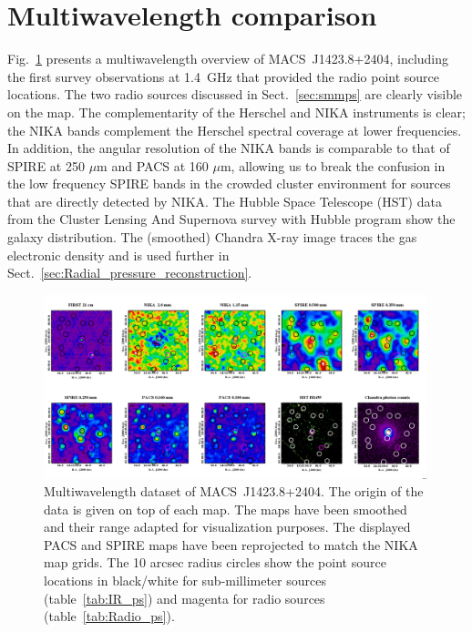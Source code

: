 \documentclass[traditabstract]{aa}
\begin{document}
\section{Multiwavelength comparison}\label{sec:Multi_wavelength_comparison}
Fig.~\ref{fig:MACSJ1424_mutiw2} presents a multiwavelength overview of \mbox{MACS~J1423.8+2404}, including the {\sc first} survey \citep[Faint Images of the Radio Sky at Twenty-Centimeters;][]{becker1995} observations at 1.4~GHz that provided the radio point source locations. The two radio sources discussed in Sect.~\ref{sec:smmps} are clearly visible on the map. The complementarity of the Herschel and NIKA instruments is clear; the NIKA bands complement the Herschel spectral coverage at lower frequencies. In addition, the angular resolution of the NIKA bands is comparable to that of SPIRE at 250 $\mu$m and PACS at 160 $\mu$m, allowing us to break the confusion in the low frequency SPIRE bands in the crowded cluster environment for sources that are directly detected by NIKA. The Hubble Space Telescope (HST) data from the Cluster Lensing And Supernova survey with Hubble program \citep[CLASH;][]{postman2012} show the galaxy distribution. The (smoothed) Chandra X-ray image traces the gas electronic density and is used further in Sect.~\ref{sec:Radial_pressure_reconstruction}.

\begin{figure}[h]
\centering
\includegraphics[trim=0cm 0cm 0cm 0cm, clip=true, width=0.99\textwidth]{Figure/MACSJ1424_multicolor.png}
\caption{\footnotesize Multiwavelength dataset of \mbox{MACS~J1423.8+2404}. The origin of the data is given on top of each map. The maps have been smoothed and their range adapted for visualization purposes. The displayed PACS and SPIRE maps have been reprojected to match the NIKA map grids. The 10 arcsec radius circles show the point source locations in black/white for sub-millimeter sources (table~\ref{tab:IR_ps}) and magenta for radio sources (table~\ref{tab:Radio_ps}).}
\label{fig:MACSJ1424_mutiw2}
\end{figure}
\end{document}

